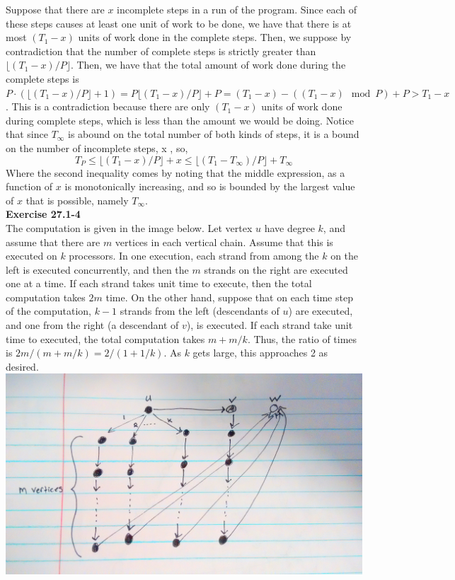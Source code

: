 \documentclass{article}
\begin{document}
Suppose that there are $x$ incomplete steps in a run of the program. Since each of these steps causes at least one unit of work to be done, we have that there is at most $(T_1-x)$ units of work done in the complete steps. Then, we suppose by contradiction that the number of complete steps is strictly greater than $\lfloor (T_1-x)/P\rfloor$. Then, we have that the total amount of work done during the complete steps is $P\cdot (\lfloor (T_1-x)/P\rfloor + 1) = P\lfloor (T_1-x)/P\rfloor +P =  (T_1-x) - ((T_1-x)\mod P) + P > T_1-x$. This is a contradiction because there are only $(T_1-x)$ units of work done during complete steps, which is less than the amount we would be doing. Notice that since $T_\infty$ is abound on the total number of both kinds of steps, it is a bound on the number of incomplete steps, x , so, 
\[
T_P \le \lfloor (T_1-x)/P\rfloor +x \le \lfloor (T_1-T_{\infty})/P\rfloor +T_{\infty} 
\]
Where the second inequality comes by noting that the middle expression, as a function of $x$ is monotonically increasing, and so is bounded by the largest value of $x$ that is possible, namely $T_{\infty}$.\\

\noindent\textbf{Exercise 27.1-4}\\

The computation is given in the image below.  Let vertex $u$ have degree $k$, and assume that there are $m$ vertices in each vertical chain.  Assume that this is executed on $k$ processors.  In one execution, each strand from among the $k$ on the left is executed concurrently, and then the $m$ strands on the right are executed one at a time.  If each strand takes unit time to execute, then the total computation takes $2m$ time.  On the other hand, suppose that on each time step of the computation, $k-1$ strands from the left (descendants of $u$) are executed, and one from the right (a descendant of $v$), is executed.  If each strand take unit time to executed, the total computation takes $m + m/k$.  Thus, the ratio of times is $2m/(m + m/k) = 2/(1+1/k)$.  As $k$ gets large, this approaches 2 as desired.  \\

\includegraphics[scale=.1]{2CompDag.jpg}\\
\end{document}
